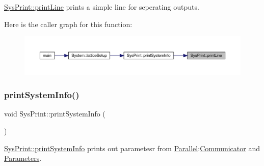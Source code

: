 \mbox{\hyperlink{class_sys_print_abdf8282e73cc002e5e572c6f09266cc9}{Sys\+Print\+::print\+Line}} prints a simple line for seperating outputs. 

Here is the caller graph for this function\+:
\nopagebreak
\begin{figure}[H]
\begin{center}
\leavevmode
\includegraphics[width=350pt]{class_sys_print_abdf8282e73cc002e5e572c6f09266cc9_icgraph}
\end{center}
\end{figure}
\mbox{\label{class_sys_print_a4572572643f6f4685081a3ae419e5ca9}} 
\subsubsection{\texorpdfstring{printSystemInfo()}{printSystemInfo()}}
{\footnotesize\ttfamily void Sys\+Print\+::print\+System\+Info (\begin{DoxyParamCaption}{ }\end{DoxyParamCaption})\hspace{0.3cm}{\ttfamily [static]}}



\mbox{\hyperlink{class_sys_print_a4572572643f6f4685081a3ae419e5ca9}{Sys\+Print\+::print\+System\+Info}} prints out parametesr from \mbox{\hyperlink{namespace_parallel}{Parallel}}\+:\mbox{\hyperlink{class_communicator}{Communicator}} and \mbox{\hyperlink{class_parameters}{Parameters}}. 

